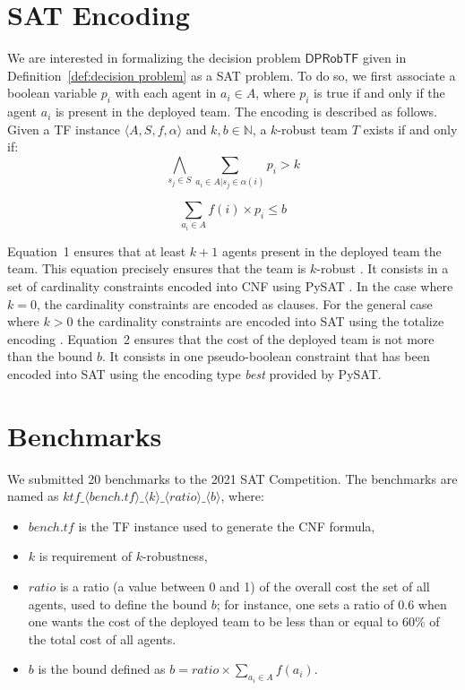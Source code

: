 \documentclass[conference]{IEEEtran}
\newcommand{\dprobtf}{\ensuremath{\mathsf{DPRobTF}}}
\theoremstyle{definition}
\begin{document}
\section{SAT Encoding}

We are interested in formalizing the decision problem \dprobtf{} given in Definition~\ref{def:decision problem}
as a SAT problem.
To do so, we first associate a boolean 
variable $p_i$ with each agent in $a_i \in A$, where $p_i$ is true
if and only if the agent $a_i$ is present in the deployed team.
The encoding is described as follows.
Given a TF instance $\langle A, S, f, \alpha\rangle$ and $k, b \in \mathbb{N}$,
a $k$-robust team $T$ exists if and only if:
\begin{equation}
\bigwedge_{s_j \in S} \sum_{a_i \in A | s_j \in \alpha(i)} p_i > k
\end{equation}

\begin{equation}
\sum_{a_i \in A} f(i) \times p_i \leq b
\end{equation}

Equation~1 ensures that at least $k + 1$ agents present in the deployed team the team.
This equation precisely ensures that the team is $k$-robust \cite{Okimoto2015}.
It consists in a set of cardinality constraints encoded into CNF using PySAT \cite{imms-sat18}.
In the case where $k = 0$, the cardinality constraints are encoded as clauses. 
For the general case where $k > 0$ the cardinality constraints are encoded into SAT using
the totalize encoding \cite{BailleuxB03}.
Equation~2 ensures that the cost of the deployed team is not more than the bound $b$.
It consists in one pseudo-boolean constraint
that has been encoded into SAT using the encoding type \textit{best} provided by PySAT.

\section{Benchmarks}

We submitted 20 benchmarks to the 2021 SAT Competition.
The benchmarks are named as $ktf\_\langle bench.tf \rangle \_\langle k \rangle\_\langle ratio \rangle\_\langle b\rangle$, where:
\begin{itemize}
	\item $bench.tf$ is the TF instance used to generate the CNF formula,
	\item $k$ is requirement of $k$-robustness,
	\item $ratio$ is a ratio (a value between 0 and 1) of the overall cost the set of all agents, used to define the bound $b$; for instance,
	one sets a ratio of 0.6 when one wants the cost of the deployed team to be less than or equal to 60\% of the total cost of all agents.
	\item $b$ is the bound defined as $b = ratio \times \sum_{a_i \in A} f(a_i)$.
\end{itemize}
\end{document}
